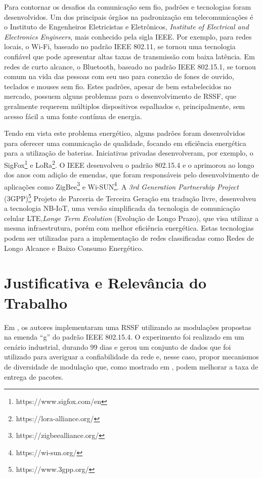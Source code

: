 Para contornar os desafios da comunicação sem fio, padrões e tecnologias foram desenvolvidos. Um dos principais órgãos na padronização em telecomunicações é o Instituto de Engenheiros Eletricistas e Eletrônicos, \emph{Institute of Electrical and Electronics Engineers}, mais conhecido pela sigla IEEE. Por exemplo, para redes locais, o Wi-Fi, baseado no padrão IEEE 802.11, se tornou uma tecnologia confiável que pode apresentar altas taxas de transmissão com baixa latência. Em redes de curto alcance, o Bluetooth, baseado no padrão IEEE 802.15.1, se tornou comum na vida das pessoas com seu uso para conexão de fones de ouvido, teclados e mouses sem fio. Estes padrões, apesar de bem estabelecidos no mercado, possuem alguns problemas para o desenvolvimento de RSSF, que geralmente requerem múltiplos dispositivos espalhados e, principalmente, sem acesso fácil a uma fonte contínua de energia.

Tendo em vista este problema energético, alguns padrões foram desenvolvidos para oferecer uma comunicação de qualidade, focando em eficiência energética para a utilização de baterias. Iniciativas privadas desenvolveram, por exemplo, o SigFox\footnote{https://www.sigfox.com/en} e LoRa\footnote{https://lora-alliance.org/}. O IEEE desenvolveu o padrão 802.15.4 e o aprimorou ao longo dos anos com adição de emendas, que foram responsáveis pelo desenvolvimento de aplicações como ZigBee\footnote{https://zigbeealliance.org/} e Wi-SUN\footnote{https://wi-sun.org/}. A \emph{3rd Generation Partnership Project} (3GPP)\footnote{https://www.3gpp.org/} Projeto de Parceria de Terceira Geração em tradução livre, desenvolveu a tecnologia NB-IoT, uma versão simplificada da tecnologia de comunicação celular LTE,\emph{Longe Term Evolution} (Evolução de Longo Prazo), que visa utilizar a mesma infraestrutura, porém com melhor eficiência energética. Estas tecnologias podem ser utilizadas para a implementação de redes classificadas como Redes de Longo Alcance e Baixo Consumo Energético.

\section{Justificativa e Relevância do Trabalho}
\label{sec:justificativa}
Em \cite{tuset2020dataset}, os autores implementaram uma RSSF utilizando as modulações propostas na emenda ``g'' do padrão IEEE 802.15.4. O experimento foi realizado em um cenário industrial, durando 99 dias e gerou um conjunto de dados que foi utilizado para averiguar a confiabilidade da rede e, nesse caso, propor mecanismos de diversidade de modulação que, como mostrado em \cite{gomes2020improving}, podem melhorar a taxa de entrega de pacotes.

